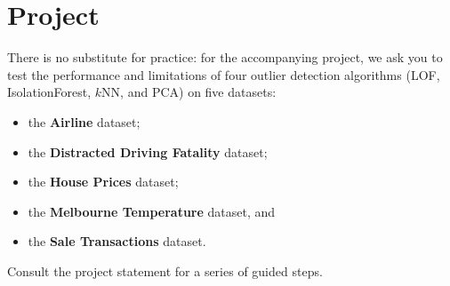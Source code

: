\section{Project} \label{Section:6}
There is no substitute for practice: for the accompanying project, we ask you to test the  performance and limitations of four outlier detection algorithms (LOF, IsolationForest, $k$NN, and PCA) on five datasets: 
\begin{itemize}[noitemsep]
\item the \textbf{Airline} dataset;
\item the \textbf{Distracted Driving Fatality} dataset;
\item the \textbf{House Prices} dataset; 
\item the \textbf{Melbourne Temperature}  dataset, and 
\item the \textbf{Sale Transactions} dataset. 
\end{itemize}
Consult the project statement for a series of guided steps. 